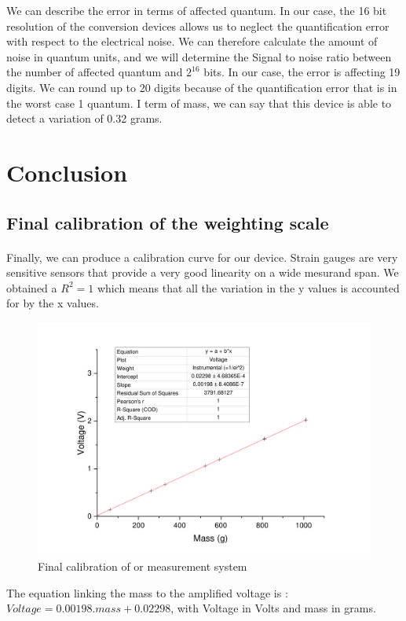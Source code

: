 \documentclass{article}[12pt]
\begin{document}
We can describe the error in terms of affected quantum. In our case, the 16 bit resolution of the conversion devices allows us to neglect the quantification error with respect to the electrical noise. We can therefore calculate the amount of noise in quantum units, and we will determine the Signal to noise ratio between the number of affected quantum and $2^{16}$ bits. In our case, the error is affecting 19 digits. We can round up to 20 digits because of the quantification error that is in the worst case 1 quantum. I term of mass, we can say that this device is able to detect a variation of 0.32 grams.
\section{Conclusion}
\subsection{Final calibration of the weighting scale}
\paragraph{}
Finally, we can produce a calibration curve for our device. Strain gauges are very sensitive sensors that provide a very good linearity on a wide mesurand span. We obtained a $R^2=1$ which means that all the variation in the y values is accounted for by the x values. 
\begin{figure}[H]
    \centering
    \includegraphics[width=.8\textwidth]{figures/calibr.pdf}
    \caption{Final calibration of or measurement system}
    \label{fig:final_calibration}
\end{figure}
The equation linking the mass to the amplified voltage is : $Voltage = 0.00198.mass+0.02298$, with Voltage in Volts and mass in grams.
\newpage
\end{document}
